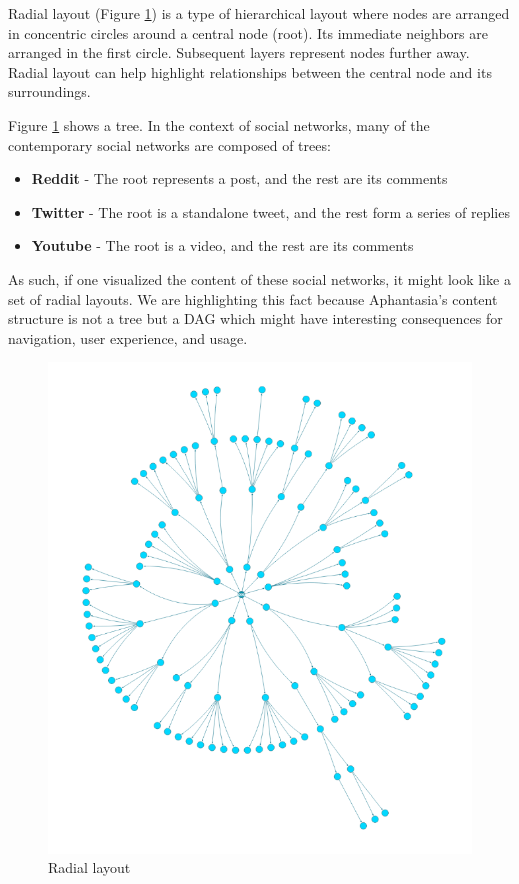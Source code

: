 Radial layout (Figure \ref{obr:graph_layout_radial}) is a type of hierarchical layout where nodes are arranged in concentric circles around a central node (root).
Its immediate neighbors are arranged in the first circle. Subsequent layers represent nodes further away.
Radial layout can help highlight relationships between the central node and its surroundings.

Figure \ref{obr:graph_layout_radial} shows a tree.
In the context of social networks, many of the contemporary social networks are composed of trees:
\begin{itemize}
    \item \textbf{Reddit} - The root represents a post, and the rest are its comments
    \item \textbf{Twitter} - The root is a standalone tweet, and the rest form a series of replies
    \item \textbf{Youtube} - The root is a video, and the rest are its comments
\end{itemize}

As such, if one visualized the content of these social networks, it might look like a set of radial layouts.
We are highlighting this fact because Aphantasia's content structure is not a \gls{tree} but a \gls{DAG}
which might have interesting consequences for navigation, user experience, and usage.

\begin{figure}[p]\centering
    \includegraphics[width=140mm, keepaspectratio]{img/graph_layout_radial.png}
    \caption{Radial layout\cite{graph_layout_demos}}
    \label{obr:graph_layout_radial}
\end{figure}

